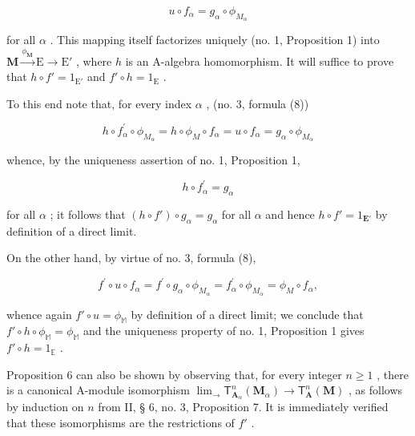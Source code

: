 \[
u \circ f _ {\alpha} = g _ {\alpha} \circ \phi_ {M _ {\alpha}}
\]

for all \(\alpha\) . This mapping itself factorizes uniquely (no. 1, Proposition 1) into \(\mathbf{M} \xrightarrow{\phi_{\mathbf{M}}} \mathrm{E} \to \mathrm{E}'\) , where \(h\) is an A-algebra homomorphism. It will suffice to prove that \(h \circ f' = 1_{\mathrm{E}'}\) and \(f' \circ h = 1_{\mathrm{E}}\) .

To this end note that, for every index \(\alpha\) , (no. 3, formula (8))

\[
h \circ f _ {\alpha} ^ {\prime} \circ \phi_ {M _ {\alpha}} = h \circ \phi_ {M} \circ f _ {\alpha} = u \circ f _ {\alpha} = g _ {\alpha} \circ \phi_ {M _ {\alpha}}
\]

whence, by the uniqueness assertion of no. 1, Proposition 1,

\[
h \circ f _ {\alpha} ^ {\prime} = g _ {\alpha}
\]

for all \(\alpha\) ; it follows that \((h \circ f') \circ g_{\alpha} = g_{\alpha}\) for all \(\alpha\) and hence \(h \circ f' = 1_{\mathbf{E}'}\) by definition of a direct limit.

On the other hand, by virtue of no. 3, formula (8),

\[
f ^ {\prime} \circ u \circ f _ {\alpha} = f ^ {\prime} \circ g _ {\alpha} \circ \phi_ {M _ {\alpha}} = f _ {\alpha} ^ {\prime} \circ \phi_ {M _ {\alpha}} = \phi_ {M} \circ f _ {\alpha},
\]

whence again \(f' \circ u = \phi_{\mathbb{M}}\) by definition of a direct limit; we conclude that \(f' \circ h \circ \phi_{\mathbb{M}} = \phi_{\mathbb{M}}\) and the uniqueness property of no. 1, Proposition 1 gives \(f' \circ h = 1_{\mathbb{E}}\) .

Proposition 6 can also be shown by observing that, for every integer \(n \geqslant 1\) , there is a canonical A-module isomorphism \(\lim_{\longrightarrow} \mathsf{T}_{\mathbf{A}_{\alpha}}^{n}(\mathbf{M}_{\alpha}) \to \mathsf{T}_{\mathbf{A}}^{n}(\mathbf{M})\) , as follows by induction on \(n\) from II, § 6, no. 3, Proposition 7. It is immediately verified that these isomorphisms are the restrictions of \(f'\) .

